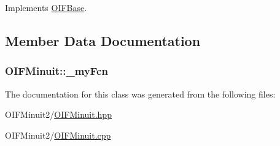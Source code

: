 Implements \hyperlink{classOIFBase_acc6067869ca4adf70f00075196c5ebdf}{OIFBase}.



\subsection{Member Data Documentation}
\hypertarget{classOIFMinuit_ae4ec346c614ffd9881ab2c24f9024351}{
\subsubsection[{\_\-myFcn}]{ {\bf OIFMinuit::\_\-myFcn}}}
\label{d5/db7/classOIFMinuit_ae4ec346c614ffd9881ab2c24f9024351}


The documentation for this class was generated from the following files:\begin{DoxyCompactItemize}
\item 
OIFMinuit2/\hyperlink{OIFMinuit_8hpp}{OIFMinuit.hpp}\item 
OIFMinuit2/\hyperlink{OIFMinuit_8cpp}{OIFMinuit.cpp}\end{DoxyCompactItemize}
